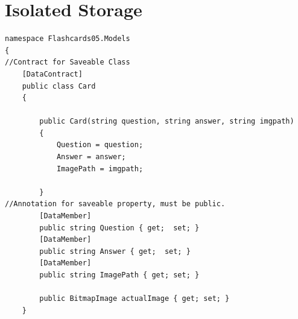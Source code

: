 \documentclass[a4paper,10pt]{scrreprt}
\begin{document}
\chapter{Isolated Storage}
\begin{lstlisting}[caption=Saveable object Example]
namespace Flashcards05.Models
{
//Contract for Saveable Class
    [DataContract] 
    public class Card
    {

        public Card(string question, string answer, string imgpath)
        {
            Question = question;
            Answer = answer;
            ImagePath = imgpath;
          
        }
//Annotation for saveable property, must be public.
        [DataMember] 
        public string Question { get;  set; }
        [DataMember] 
        public string Answer { get;  set; }
        [DataMember] 
        public string ImagePath { get; set; }

        public BitmapImage actualImage { get; set; }
    }
\end{lstlisting}
\end{document}
